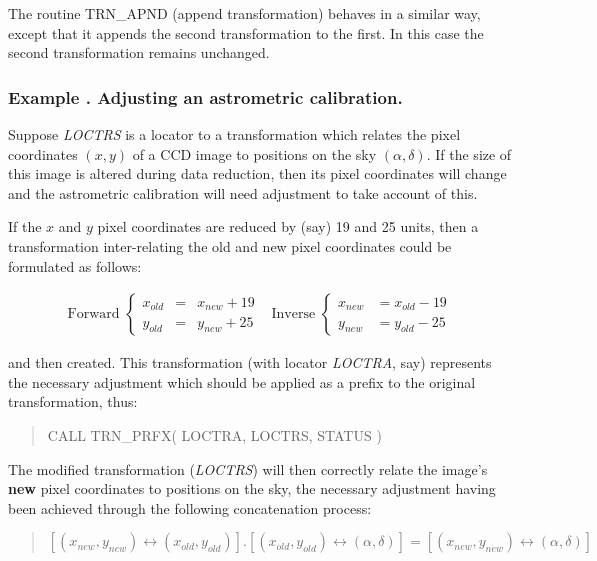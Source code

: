 \documentclass[twoside,nolof,11pt]{starlink}
\providecommand{\name}[1]{\small{#1}}
\providecommand{\fortvar}[1]{\emph{#1}}
\newcounter{examplecounter}
\providecommand{\example}[1]{\addtocounter{examplecounter}{1}
                         \subsubsection*{Example \theexamplecounter. #1}}
\begin{document}
The routine \name{TRN\_APND} (append transformation) behaves in a similar
way, except that it appends the second transformation to the first. In this
case the second transformation remains unchanged.

\example{Adjusting an astrometric calibration.}
Suppose \fortvar{LOCTRS} is a locator to a transformation which relates the
pixel coordinates $(x,y)$ of a \name{CCD} image to positions on the
sky $(\alpha,\delta)$.
If the size of this image is altered during data reduction, then its pixel
coordinates will change and the astrometric calibration will need adjustment
to take account of this.

If the $x$ and $y$ pixel coordinates are reduced by (say) 19 and 25 units,
then a transformation inter-relating the old and new pixel coordinates could
be formulated as follows:

\begin{equation}
\begin{array}{cc}

\mbox{Forward } \left\{
\begin{array}{lll}
x_{old} & = & x_{new} + 19 \\
y_{old} & = & y_{new} + 25
\end{array}
\right.
&
\mbox{Inverse } \left\{
\begin{array}{lll}
x_{new} & = x_{old} - 19 \\
y_{new} & = y_{old} - 25
\end{array}
\right.

\end{array}
\end{equation}

and then created.
This transformation (with locator \fortvar{LOCTRA}, say) represents the
necessary adjustment which should be applied as a prefix to the original
transformation, thus:

\begin{quote}
\begin{terminalv}
CALL TRN_PRFX( LOCTRA, LOCTRS, STATUS )
\end{terminalv}
\end{quote}

The modified transformation (\fortvar{LOCTRS}\/) will then correctly relate
the image's \textbf{new} pixel coordinates to positions on the sky, the
necessary adjustment having been achieved through the following
concatenation process:

\begin{quote}
\begin{center}
$[(x_{new},y_{new}) \leftrightarrow (x_{old},y_{old})].[(x_{old},y_{old})
\leftrightarrow (\alpha,\delta)] = [(x_{new},y_{new}) \leftrightarrow
(\alpha,\delta)]$
\end{center}
\end{quote}
\end{document}
